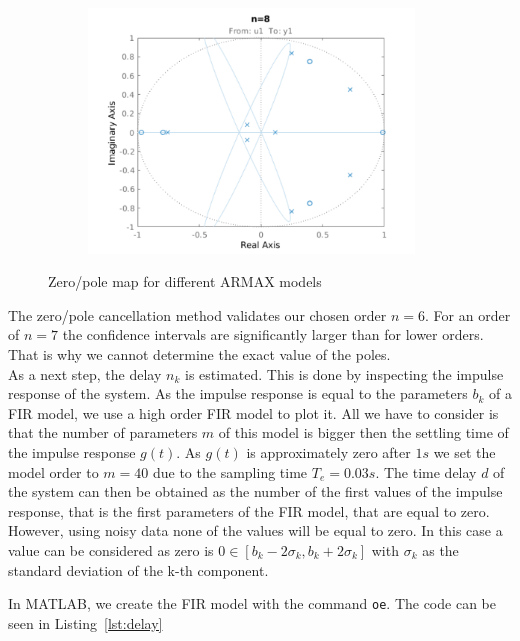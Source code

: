 \documentclass{scrartcl}
\begin{document}
\begin{figure}[h]
\begin{subfigure}{.49\textwidth}
		\label{fig:zp7}
	\end{subfigure}\hfill
	\begin{subfigure}{.49\textwidth}
		\includegraphics[height=6.5cm]{figures/zp8.pdf}
		\label{fig:zp8}
	\end{subfigure}
	\caption{Zero/pole map for different ARMAX models}
	\label{fig:zero_pole}
\end{figure}

The zero/pole cancellation method validates our chosen order $n=6$. For an order of $n=7$ the confidence intervals are significantly larger than for lower orders. That is why we cannot determine the exact value of the poles. \\

As a next step, the delay $n_k$ is estimated. This is done by inspecting the impulse response of the system. As the impulse response is equal to the parameters $b_k$ of a FIR model, we use a high order FIR model to plot it. All we have to consider is that the number of parameters $m$ of this model is bigger then the settling time of the impulse response $g(t)$. As $g(t)$ is approximately zero after $ 1 s$ we set the model order to $m = 40$ due to the sampling time $T_e = 0.03 s$.
The time delay $d$ of the system can then be obtained as the number of the first values of the impulse response, that is the first parameters of the FIR model, that are equal to zero. 
However, using noisy data none of the values will be equal to zero. In this case a value can be considered as zero is $ 0 \in \left[b_k -2 \sigma_k, b_k + 2\sigma_k \right] $ with $\sigma_k$ as the standard deviation of the k-th component. 

In MATLAB, we create the FIR model with the command \texttt{oe}. The code can be seen in Listing~\ref{lst:delay}
\end{document}
